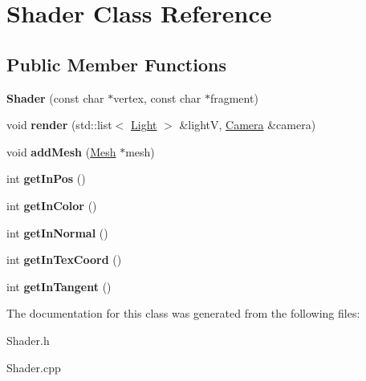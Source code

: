 \hypertarget{class_shader}{}\section{Shader Class Reference}
\label{class_shader}
\subsection*{Public Member Functions}
\begin{DoxyCompactItemize}
\item 
\mbox{\label{class_shader_a7e02f1eaec796a7fc02c3191ce9fa5d4}} 
{\bfseries Shader} (const char $\ast$vertex, const char $\ast$fragment)
\item 
\mbox{\label{class_shader_a4bb445563c154a27e3dc0e1036690841}} 
void {\bfseries render} (std\+::list$<$ \hyperlink{class_light}{Light} $>$ \&lightV, \hyperlink{class_camera}{Camera} \&camera)
\item 
\mbox{\label{class_shader_ab6af37727a2f0a0e5f31fb05e9137853}} 
void {\bfseries add\+Mesh} (\hyperlink{class_mesh}{Mesh} $\ast$mesh)
\item 
\mbox{\label{class_shader_ad52dea081c158e54bd3dcd5168623a3f}} 
int {\bfseries get\+In\+Pos} ()
\item 
\mbox{\label{class_shader_ae39ec6d01ef565e170cce67c75d3fa3d}} 
int {\bfseries get\+In\+Color} ()
\item 
\mbox{\label{class_shader_a9647f6a0356188f9f56787dbebde4731}} 
int {\bfseries get\+In\+Normal} ()
\item 
\mbox{\label{class_shader_a386214ac36c08a8405ec458f75d17d12}} 
int {\bfseries get\+In\+Tex\+Coord} ()
\item 
\mbox{\label{class_shader_aad0dc2b502af0bcf6c5aa99e60fc296a}} 
int {\bfseries get\+In\+Tangent} ()
\end{DoxyCompactItemize}


The documentation for this class was generated from the following files\+:\begin{DoxyCompactItemize}
\item 
Shader.\+h\item 
Shader.\+cpp\end{DoxyCompactItemize}
